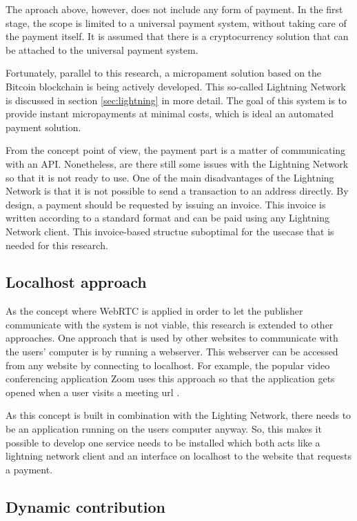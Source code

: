 The aproach above, however, does not include any form of payment. In the first stage, the scope is limited to a universal payment system, without taking care of the payment itself. It is assumed that there is a cryptocurrency solution that can be attached to the universal payment system.

Fortunately, parallel to this research, a micropament solution based on the Bitcoin blockchain is being actively developed. This so-called Lightning Network is discussed in section \ref{sec:lightning} in more detail. The goal of this system is to provide instant micropayments at minimal costs, which is ideal an automated payment solution.

From the concept point of view, the payment part is a matter of communicating with an API. Nonetheless, are there still some issues with the Lightning Network so that it is not ready to use. One of the main disadvantages of the Lightning Network is that it is not possible to send a transaction to an address directly. By design, a payment should be requested by issuing an invoice. This invoice is written according to a standard format and can be paid using any Lightning Network client. This invoice-based structue suboptimal for the usecase that is needed for this research.





\subsection{Localhost approach}

As the concept where WebRTC is applied in order to let the publisher communicate with the system is not viable, this research is extended to other approaches. One approach that is used by other websites to communicate with the users' computer is by running a webserver. This webserver can be accessed from any website by connecting to localhost. For example, the popular video conferencing application Zoom uses this approach so that the application gets opened when a user visits a meeting url \cite{zoomwebserver}.

As this concept is built in combination with the Lighting Network, there needs to be an application running on the users computer anyway. So, this makes it possible to develop one service needs to be installed which both acts like a lightning network client and an interface on localhost to the website that requests a payment.

\subsection{Dynamic contribution}

